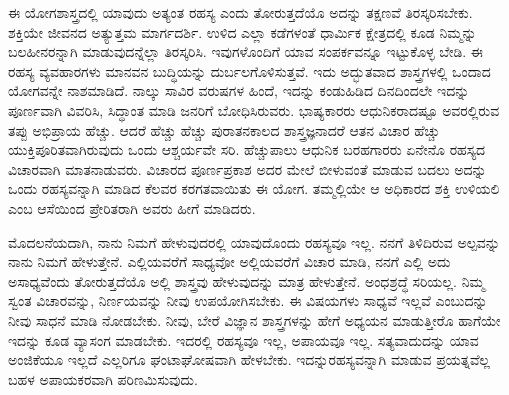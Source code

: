 \vskip 6pt

ಈ ಯೋಗಶಾಸ್ತ್ರದಲ್ಲಿ ಯಾವುದು ಅತ್ಯಂತ ರಹಸ್ಯ ಎಂದು ತೋರುತ್ತದೆಯೊ ಅದನ್ನು ತಕ್ಷಣವೆ ತಿರಸ್ಕರಿಸಬೇಕು. ಶಕ್ತಿಯೇ ಜೀವನದ ಅತ್ಯುತ್ತಮ ಮಾರ್ಗದರ್ಶಿ. ಉಳಿದ ಎಲ್ಲಾ ಕಡೆಗಳಂತೆ ಧಾರ್ಮಿಕ ಕ್ಷೇತ್ರದಲ್ಲಿ ಕೂಡ ನಿಮ್ಮನ್ನು ಬಲಹೀನರನ್ನಾಗಿ ಮಾಡುವುದನ್ನೆಲ್ಲಾ ತಿರಸ್ಕರಿಸಿ. ಇವುಗಳೊಂದಿಗೆ ಯಾವ ಸಂಪರ್ಕವನ್ನೂ ಇಟ್ಟುಕೊಳ್ಳ ಬೇಡಿ. ಈ ರಹಸ್ಯ ವ್ಯವಹಾರಗಳು ಮಾನವನ ಬುದ್ಧಿಯನ್ನು ದುರ್ಬಲಗೊಳಿಸುತ್ತವೆ. ಇದು ಅದ್ಭುತವಾದ ಶಾಸ್ತ್ರಗಳಲ್ಲಿ ಒಂದಾದ ಯೋಗವನ್ನೇ ನಾಶಮಾಡಿದೆ. ನಾಲ್ಕು ಸಾವಿರ ವರುಷಗಳ ಹಿಂದೆ, ಇದನ್ನು ಕಂಡುಹಿಡಿದ ದಿನದಿಂದಲೇ ಇದನ್ನು ಪೂರ್ಣವಾಗಿ ವಿವರಿಸಿ, ಸಿದ್ಧಾಂತ ಮಾಡಿ ಜನರಿಗೆ ಬೋಧಿಸಿರುವರು. ಭಾಷ್ಯಕಾರರು ಆಧುನಿಕರಾದಷ್ಟೂ ಅವರಲ್ಲಿರುವ ತಪ್ಪು ಅಭಿಪ್ರಾಯ ಹೆಚ್ಚು. ಆದರೆ ಹೆಚ್ಚು ಹೆಚ್ಚು ಪುರಾತನಕಾಲದ ಶಾಸ್ತ್ರಜ್ಞನಾದರೆ ಆತನ ವಿಚಾರ ಹೆಚ್ಚು ಯುಕ್ತಿಪೂರಿತವಾಗಿರುವುದು ಒಂದು ಆಶ್ಚರ್ಯವೇ ಸರಿ. ಹೆಚ್ಚುಪಾಲು ಆಧುನಿಕ ಬರಹಗಾರರು ಏನೇನೊ ರಹಸ್ಯದ ವಿಚಾರವಾಗಿ ಮಾತನಾಡುವರು. ವಿಚಾರದ ಪೂರ್ಣಪ್ರಕಾಶ ಅದರ ಮೇಲೆ ಬೀಳುವಂತೆ ಮಾಡುವ ಬದಲು ಅದನ್ನು ಒಂದು ರಹಸ್ಯವನ್ನಾಗಿ ಮಾಡಿದ ಕೆಲವರ ಕರಗತವಾಯಿತು ಈ ಯೋಗ. ತಮ್ಮಲ್ಲಿಯೇ ಆ ಅಧಿಕಾರದ ಶಕ್ತಿ ಉಳಿಯಲಿ ಎಂಬ ಆಸೆಯಿಂದ ಪ್ರೇರಿತರಾಗಿ ಅವರು ಹೀಗೆ ಮಾಡಿದರು. 

\vskip 6pt

ಮೊದಲನೆಯದಾಗಿ, ನಾನು ನಿಮಗೆ ಹೇಳುವುದರಲ್ಲಿ ಯಾವುದೊಂದು ರಹಸ್ಯವೂ ಇಲ್ಲ. ನನಗೆ ತಿಳಿದಿರುವ ಅಲ್ಪವನ್ನು ನಾನು ನಿಮಗೆ ಹೇಳುತ್ತೇನೆ. ಎಲ್ಲಿಯವರೆಗೆ ಸಾಧ್ಯವೋ ಅಲ್ಲಿಯವರೆಗೆ ವಿಚಾರ ಮಾಡಿ, ನನಗೆ ಎಲ್ಲಿ ಅದು ಅಸಾಧ್ಯವೆಂದು ತೋರುತ್ತದೆಯೊ ಅಲ್ಲಿ ಶಾಸ್ತ್ರವು ಹೇಳುವುದನ್ನು ಮಾತ್ರ ಹೇಳುತ್ತೇನೆ. ಅಂಧಶ್ರದ್ಧೆ ಸರಿಯಲ್ಲ. ನಿಮ್ಮ ಸ್ವಂತ ವಿಚಾರವನ್ನು, ನಿರ್ಣಯವನ್ನು ನೀವು ಉಪಯೋಗಿಸಬೇಕು. ಈ ವಿಷಯಗಳು ಸಾಧ್ಯವೆ ಇಲ್ಲವೆ ಎಂಬುದನ್ನು ನೀವು ಸಾಧನೆ ಮಾಡಿ ನೋಡಬೇಕು. ನೀವು, ಬೇರೆ ವಿಜ್ಞಾನ ಶಾಸ್ತ್ರಗಳನ್ನು ಹೇಗೆ ಅಧ್ಯಯನ ಮಾಡುತ್ತೀರೊ ಹಾಗೆಯೇ ಇದನ್ನು ಕೂಡ ವ್ಯಾಸಂಗ ಮಾಡಬೇಕು. ಇದರಲ್ಲಿ ರಹಸ್ಯವೂ ಇಲ್ಲ, ಅಪಾಯವೂ ಇಲ್ಲ. ಸತ್ಯವಾದುದನ್ನು ಯಾವ ಅಂಜಿಕೆಯೂ ಇಲ್ಲದೆ ಎಲ್ಲರಿಗೂ ಘಂಟಾಘೋಷವಾಗಿ ಹೇಳಬೇಕು. ಇದನ್ನುರಹಸ್ಯವನ್ನಾಗಿ ಮಾಡುವ ಪ್ರಯತ್ನವೆಲ್ಲ ಬಹಳ ಅಪಾಯಕರವಾಗಿ ಪರಿಣಮಿಸುವುದು. 

